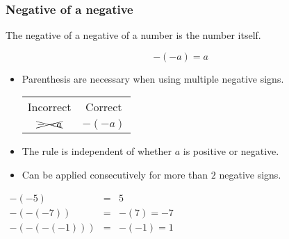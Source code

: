 
\begin{frame}
\frametitle{Negative of a negative}
\begin{mathematicalRule}
The negative of a negative of a number is the number itself.

\[
-(-a) = a
\]
\end{mathematicalRule}
\begin{itemize}
\item Parenthesis are necessary when using multiple negative signs.

\hfil\hfil \begin{tabular}{cc}
Incorrect& Correct\\
$
\xcancel{--a}
$&$-(-a)$
\end{tabular}

\item The rule is independent of whether $a$ is positive or negative.
\item Can be applied consecutively for more than $2$ negative signs.
\end{itemize}
\begin{example}
\hfil $
\begin{array}{rcl}
-(-5)&=& 5\\
-(-(-7))&=&-(7)=-7\\
-(-(-(-1)))&=&-(-1)=1\\
\end{array}$
\end{example}
\end{frame}